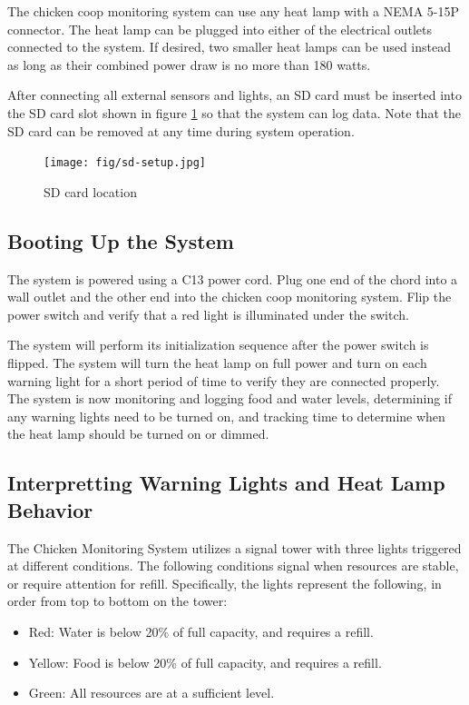 \documentclass{article}
\begin{document}
The chicken coop monitoring system can use any heat lamp with a NEMA 5-15P connector.  The heat lamp can be plugged into either of the electrical outlets connected to the system.  If desired, two smaller heat lamps can be used instead as long as their combined power draw is no more than 180 watts.

After connecting all external sensors and lights, an SD card must be inserted into the SD card slot shown in figure \ref{fig:sd-card-location} so that the system can log data.  Note that the SD card can be removed at any time during system operation.

\begin{figure}[H]
    \centering
    \texttt{[image: fig/sd-setup.jpg]}
    \caption{SD card location}
    \label{fig:sd-card-location}
\end{figure}

\subsection{Booting Up the System}
The system is powered using a C13 power cord.  Plug one end of the chord into a wall outlet and the other end into the chicken coop monitoring system.  Flip the power switch and verify that a red light is illuminated under the switch.

The system will perform its initialization sequence after the power switch is flipped.  The system will turn the heat lamp on full power and turn on each warning light for a short period of time to verify they are connected properly.  The system is now monitoring and logging food and water levels, determining if any warning lights need to be turned on, and tracking time to determine when the heat lamp should be turned on or dimmed.

\subsection{Interpretting Warning Lights and Heat Lamp Behavior}
The Chicken Monitoring System utilizes a signal tower with three lights triggered at different conditions. The following conditions signal when resources are stable, or require attention for refill. Specifically, the lights represent the following, in order from top to bottom on the tower:

\begin{itemize}
    \item Red: Water is below 20\% of full capacity, and requires a refill.
    \item Yellow: Food is below 20\% of full capacity, and requires a refill.
    \item Green: All resources are at a sufficient level.
\end{itemize}
\end{document}
